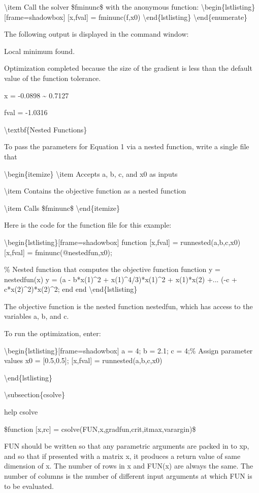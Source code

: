 \documentclass[10pt,math=newtx,citestyle=gb7714-2015,bibstyle=gb7714-2015]{elegantbook}
\begin{document}
	\textbackslash{}item Call the solver \$fminunc\$ with the anonymous function:
	\textbackslash{}begin\{lstlisting\}[frame=shadowbox]
	[x,fval] = fminunc(f,x0)
	\textbackslash{}end\{lstlisting\}
	\textbackslash{}end\{enumerate\}
	
	The following output is displayed in the command window:
	
	Local minimum found.
	
	Optimization completed because the size of the gradient is less than the default value of the function tolerance.
	
	x =
	-0.0898  \~{}  0.7127
	
	fval =
	-1.0316
	
	\textbackslash{}textbf\{Nested Functions\}   
	
	To pass the parameters for Equation 1 via a nested function, write a single file that
	
	\textbackslash{}begin\{itemize\}
	\textbackslash{}item Accepts a, b, c, and x0 as inputs
	
	\textbackslash{}item Contains the objective function as a nested function
	
	\textbackslash{}item Calls \$fminunc\$
	\textbackslash{}end\{itemize\}
	
	Here is the code for the function file for this example:
	
	
	\textbackslash{}begin\{lstlisting\}[frame=shadowbox]
	function [x,fval] =  runnested(a,b,c,x0)
	[x,fval] = fminunc(@nestedfun,x0);
	
	\% Nested function that computes the objective function
	function y = nestedfun(x)
	y = (a - b*x(1)\^{}2 + x(1)\^{}4/3)*x(1)\^{}2 + x(1)*x(2) +...
	(-c + c*x(2)\^{}2)*x(2)\^{}2;
	end
	end
	\textbackslash{}end\{lstlisting\}
	
	The objective function is the nested function nestedfun, which has access to the variables a, b, and c.
	
	To run the optimization, enter:
	
	\textbackslash{}begin\{lstlisting\}[frame=shadowbox]
	a = 4; b = 2.1; c = 4;\% Assign parameter values
	x0 = [0.5,0.5];
	[x,fval] = runnested(a,b,c,x0)
	
	\textbackslash{}end\{lstlisting\}
	
	\textbackslash{}subsection\{csolve\}
	
	help csolve
	
	\$function [x,rc] = csolve(FUN,x,gradfun,crit,itmax,varargin)\$
	
	FUN should be written so that any parametric arguments are packed in to xp, and so that if presented with a matrix x, it produces a return value of same dimension of x.  The number of rows in x and FUN(x) are always the same.  The number of columns is the number of different input arguments at which FUN is to be evaluated.
	
\end{document}
